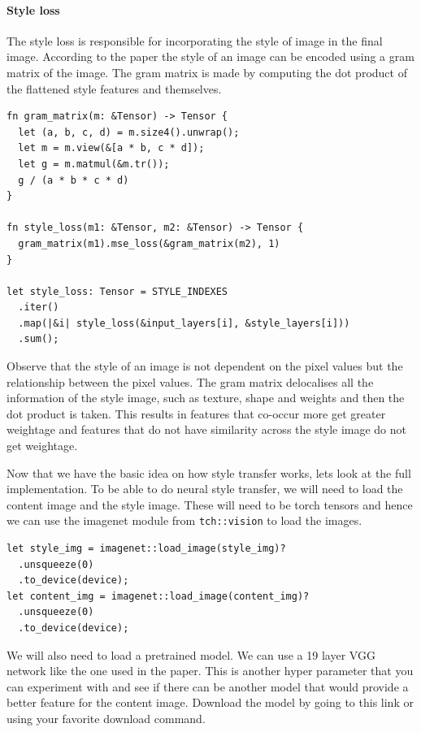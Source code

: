 \documentclass{book}
\begin{document}
\label{par:content_loss}
\paragraph{Style loss}%
The style loss is responsible for incorporating the style of image in the final image. According to the paper the style of an image can be encoded using a gram matrix of the image. The gram matrix is made by computing the dot product of the flattened style features and themselves.

\begin{lstlisting}[caption={https://github.com/LaurentMazare/tch-rs/blob/master/examples/neural-style-transfer/main.rs}, basicstyle=\small]
fn gram_matrix(m: &Tensor) -> Tensor {
  let (a, b, c, d) = m.size4().unwrap();
  let m = m.view(&[a * b, c * d]);
  let g = m.matmul(&m.tr());
  g / (a * b * c * d)
}

fn style_loss(m1: &Tensor, m2: &Tensor) -> Tensor {
  gram_matrix(m1).mse_loss(&gram_matrix(m2), 1)
}

let style_loss: Tensor = STYLE_INDEXES
  .iter()
  .map(|&i| style_loss(&input_layers[i], &style_layers[i]))
  .sum();
\end{lstlisting}

Observe that the style of an image is not dependent on the pixel values but the relationship between the pixel values. The gram matrix delocalises all the information of the style image, such as texture, shape and weights and then the dot product is taken. This results in features that co-occur more get greater weightage and features that do not have similarity across the style image do not get weightage. 
\label{par:style_loss}

Now that we have the basic idea on how style transfer works, lets look at the full implementation. To be able to do neural style transfer, we will need to load the content image and the style image. These will need to be torch tensors and hence we can use the imagenet module from \lstinline{tch::vision} to load the images.

\begin{lstlisting}[caption={https://github.com/LaurentMazare/tch-rs/blob/master/examples/neural-style-transfer/main.rs}, basicstyle=\small]
let style_img = imagenet::load_image(style_img)?
  .unsqueeze(0)
  .to_device(device);
let content_img = imagenet::load_image(content_img)?
  .unsqueeze(0)
  .to_device(device);
\end{lstlisting}

We will also need to load a pretrained model. We can use a 19 layer VGG network like the one used in the paper. This is another hyper parameter that you can experiment with and see if there can be another model that would provide a better feature for the content image. Download the model by going to this link or using your favorite download command.
\end{document}
